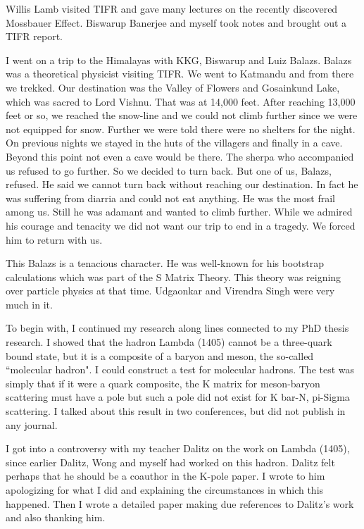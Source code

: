 \vskip -10pt
Willis Lamb visited TIFR and gave many lectures on the recently 
discovered Mossbauer Effect. Biswarup Banerjee and myself took notes and 
brought out a TIFR report.
                 
I went on a trip to the Himalayas with KKG, Biswarup and Luiz Balazs. 
Balazs was a theoretical physicist visiting TIFR. We went to Katmandu 
and from there we trekked. Our destination was the Valley of Flowers and 
Gosainkund Lake, which was sacred to Lord Vishnu. That was at 14,000 
feet. After reaching 13,000 feet or so, we reached the snow-line and we 
could not climb further since we were not equipped for snow. Further we 
were told there were no shelters for the night. On previous nights we 
stayed in the huts of the villagers and finally in a cave. Beyond this 
point not even a cave would be there. The sherpa who accompanied us 
refused to go further. So we decided to turn back. But one of us, 
Balazs, refused. He said we cannot turn back without reaching our 
destination. In fact he was suffering from diarria and could not eat 
anything. He was the most frail among us. Still he was adamant and 
wanted to climb further. While we admired his courage and tenacity we 
did not want our trip to end in a tragedy. We forced him to return with 
us.

This Balazs is a tenacious character. He was well-known for his 
bootstrap calculations which was part of the S Matrix Theory. This 
theory was reigning over particle physics at that time. Udgaonkar and 
Virendra Singh were very much in it.

To begin with, I continued my research along lines connected to my PhD 
thesis research. I showed that the hadron Lambda (1405) cannot be a 
three-quark bound state, but it is a compo\-site of a baryon and meson, 
the so-called ``molecular hadron". I could construct a test for molecular 
hadrons. The test was simply that if it were a quark composite, the K 
matrix for meson-baryon scatte\-ring must have a pole but such a pole did 
not exist for K bar-N, pi-Sigma scattering. I talked about this result 
in two conferences, but did not publish in any journal.

I got into a controversy with my teacher Dalitz on the work on Lambda 
(1405), since earlier Dalitz, Wong and myself had wo\-rked on this hadron. 
Dalitz felt perhaps that he should be a coauthor in the K-pole paper. I 
wrote to him apologizing for what I did and explaining the circumstances 
in which this happened. Then I wrote a detailed paper making due 
references to Dalitz's work and also thanking him.

